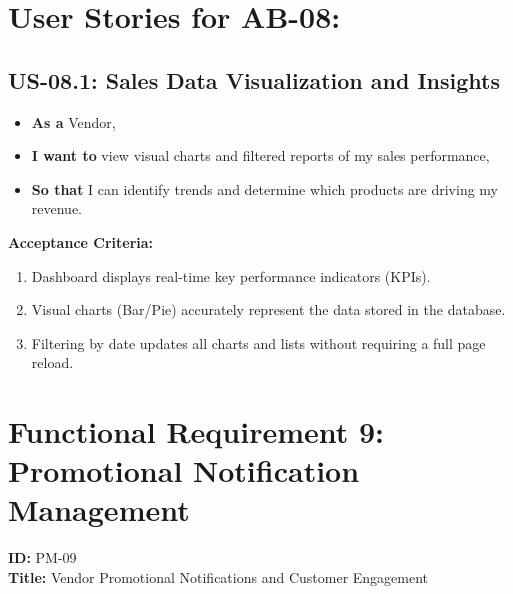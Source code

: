 \section*{User Stories for AB-08: }

\subsection*{US-08.1: Sales Data Visualization and Insights}
\begin{itemize}
    \item \textbf{As a} Vendor,
    \item \textbf{I want to} view visual charts and filtered reports of my sales performance,
    \item \textbf{So that} I can identify trends and determine which products are driving my revenue.
\end{itemize}

\noindent\textbf{Acceptance Criteria:}
\begin{enumerate}
    \item Dashboard displays real-time key performance indicators (KPIs).
    \item Visual charts (Bar/Pie) accurately represent the data stored in the database.
    \item Filtering by date updates all charts and lists without requiring a full page reload.

\end{enumerate}

%
%
%

\section{Functional Requirement 9: Promotional Notification Management
}

\textbf{ID:} PM-09 \\
\textbf{Title:} Vendor Promotional Notifications and Customer Engagement

